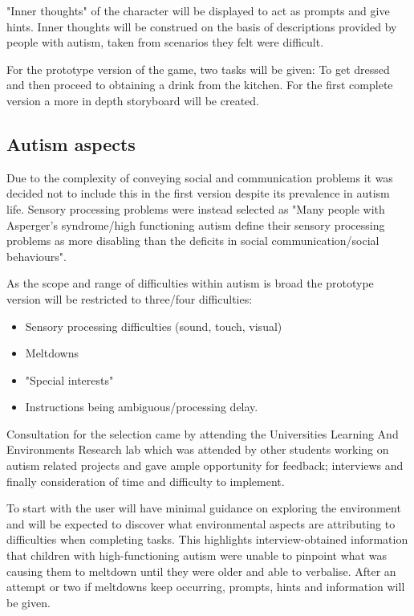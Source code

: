\documentclass[11pt]{report}
\begin{document}
"Inner thoughts" of the character will be displayed to act as prompts and give hints. Inner thoughts will be construed on the basis of descriptions provided by people with autism, taken from scenarios they felt were difficult.

For the prototype version of the game, two tasks will be given: To get dressed and then proceed to obtaining a drink from the kitchen. For the first complete version a more in depth storyboard will be created. 

\subsection{Autism aspects}
Due to the complexity of conveying social and communication problems it was decided not to include this in the first version despite its prevalence in autism life. Sensory processing problems were instead selected as "Many people with Asperger's syndrome/high functioning autism define their sensory processing problems as more disabling than the deficits in social communication/social behaviours"\cite{olgab}.

As the scope and range of difficulties within autism is broad the prototype version will be restricted to three/four difficulties:

\begin{itemize}
\item Sensory processing difficulties (sound, touch, visual)   
\item Meltdowns
\item "Special interests"
\item Instructions being ambiguous/processing delay.
\end{itemize}

Consultation for the selection came by attending the Universities Learning And Environments Research lab which was attended by other students working on autism related projects and gave ample opportunity for feedback; interviews and finally consideration of time and difficulty to implement.  

To start with the user will have minimal guidance on exploring the environment and will be expected to discover what environmental aspects are attributing to difficulties when completing tasks. This highlights interview-obtained information that children with high-functioning autism were unable to pinpoint what was causing them to meltdown until they were older and able to verbalise. After an attempt or two if meltdowns keep occurring, prompts, hints and information will be given.
\end{document}

